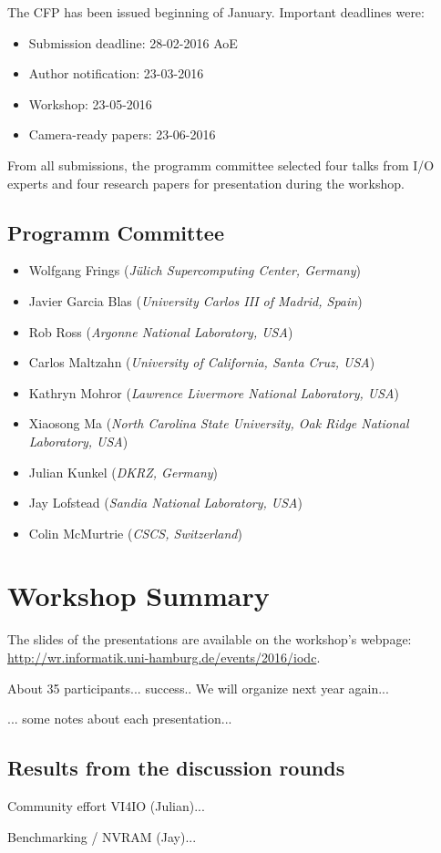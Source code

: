 \documentclass{llncs}
\begin{document}
\noindent The CFP has been issued beginning of January.
Important deadlines were:
\begin{itemize}
  \item Submission deadline: 28-02-2016 AoE
  \item Author notification: 23-03-2016
  \item Workshop: 23-05-2016
  \item Camera-ready papers: 23-06-2016  
\end{itemize}

From all submissions, the programm committee selected four talks from I/O experts and four research papers for presentation during the workshop.

\subsection{Programm Committee}
\begin{itemize}
  \item Wolfgang Frings (\textit{Jülich Supercomputing Center, Germany})
  \item Javier Garcia Blas (\textit{University Carlos III of Madrid, Spain})
  \item  Rob Ross (\textit{Argonne National Laboratory, USA})
  \item   Carlos Maltzahn (\textit{University of California, Santa Cruz, USA})
  \item  Kathryn Mohror (\textit{Lawrence Livermore National Laboratory, USA})
  \item  Xiaosong Ma (\textit{North Carolina State University, Oak Ridge National Laboratory, USA})
  \item  Julian Kunkel (\textit{DKRZ, Germany})
  \item  Jay Lofstead (\textit{Sandia National Laboratory, USA})
  \item  Colin McMurtrie (\textit{CSCS, Switzerland})
\end{itemize}



\section{Workshop Summary}

The slides of the presentations are available on the workshop's webpage: \\ 
\url{http://wr.informatik.uni-hamburg.de/events/2016/iodc}.
\label{sec:summary}

About 35 participants... success.. We will organize next year again...

... some notes about each presentation...

\subsection{Results from the discussion rounds}

Community effort VI4IO (Julian)...

Benchmarking / NVRAM (Jay)...





\end{document}
